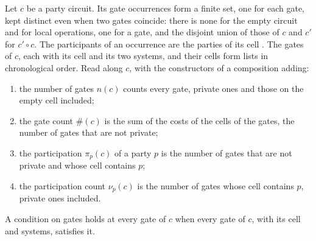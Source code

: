 \begin{definition}
    \label{def:party_gate_counts}
    \leanok
    Let $c$ be a party circuit. Its gate occurrences form a finite set, one for each
    gate, kept distinct even when two gates coincide: there is none for the empty
    circuit and for local operations, one for a gate, and the disjoint union of those
    of $c$ and $c'$ for $c'\circ c$. The participants of an occurrence are the parties
    of its cell \cite[Section~5.1]{OpenAI2026PolynomialPEPS}. The gates of $c$, each
    with its cell and its two systems, and their cells form lists in chronological
    order. Read along $c$, with the constructors of a composition adding:
    \begin{enumerate}
        \item the number of gates $n(c)$ counts every gate, private ones and those on
              the empty cell included;
        \item the gate count $\#(c)$ is the sum of the costs of the cells of the gates,
              the number of gates that are not private;
        \item the participation $\pi_p(c)$ of a party $p$ is the number of gates that
              are not private and whose cell contains $p$;
        \item the participation count $\nu_p(c)$ is the number of gates whose cell
              contains $p$, private ones included.
    \end{enumerate}
    A condition on gates holds at every gate of $c$ when every gate of $c$, with its
    cell and systems, satisfies it.
\end{definition}

